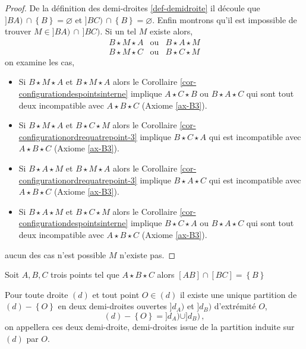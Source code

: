 \begin{thm}
\begin{proof}
        De la définition des demi-droites \ref{def-demidroite} il découle que $]BA)\,\cap \left\{B\right\}=\varnothing$ et $]BC)\,\cap \left\{B\right\}=\varnothing$. Enfin montrons qu'il est impossible de trouver $M \in ]BA)\,\cap\, ]BC)$. Si un tel $M$ existe alors,
        \begin{equation*}
            \begin{array}{ccc}
                 B\star M \star A & \text{ou} & B\star A \star M \\
                 B\star M \star C & \text{ou} & B\star C \star M
            \end{array}
        \end{equation*}
        on examine les cas,
        \begin{itemize}[$\bullet$]
            \item Si $B\star M \star A$ et $B\star M \star A$ alors le Corollaire \ref{cor-configurationdespointsinterne} implique $A \star C \star B$ ou $B \star A \star C$ qui sont tout deux incompatible avec $A\star B\star C$ (Axiome \ref{ax-B3}). 
            \item Si $B\star M \star A$ et $B\star C \star M$ alors le Corollaire \ref{cor-configurationordrequatrepoint-3} implique $B \star C \star A$ qui est incompatible avec $A\star B\star C$ (Axiome \ref{ax-B3}). 
            \item Si $B\star A \star M$ et $B\star M \star A$ alors le Corollaire \ref{cor-configurationordrequatrepoint-3} implique $B \star A \star C$ qui est incompatible avec $A\star B\star C$ (Axiome \ref{ax-B3}). 
            \item Si $B\star A \star M$ et $B\star C \star M$ alors le Corollaire \ref{cor-configurationdespointsinterne} implique $B \star C \star A$ ou $B \star A \star C$ qui sont tout deux incompatible avec $A\star B\star C$ (Axiome \ref{ax-B3}). 
        \end{itemize}
        aucun des cas n'est possible $M$ n'existe pas. 
    \end{proof}
\end{thm}
\begin{cor}
    Soit $A,B,C$ trois points tel que $A\star B\star C$ alors $[AB]\cap[BC]=\left\{B\right\}$
\end{cor}
\begin{cor}\label{cor-partitiondroite}
    Pour toute droite $(d)$ et tout point $O\in (d)$ il existe une unique partition de $(d)-\left\{O\right\}$ en deux demi-droites ouvertes $]d_A)$ et $]d_B)$ d'extrémité $O$,
    \begin{equation*}
        (d)-\left\{O\right\} = ]d_A) \cup ]d_B)\,,
    \end{equation*}
    on appellera ces deux demi-droite, demi-droites issue de la partition induite sur $(d)$ par $O$.
\end{cor}
